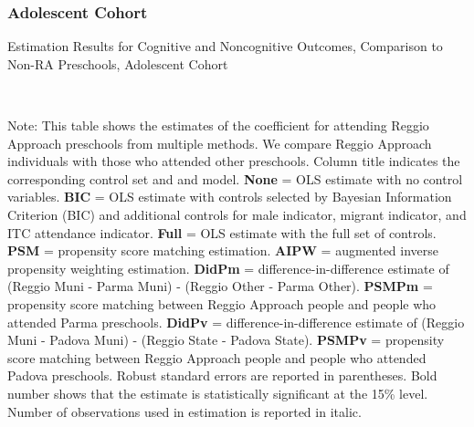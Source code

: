 \subsubsection{Adolescent Cohort}
\begin{table}[H] \caption{Estimation Results for Cognitive and Noncognitive Outcomes, Comparison to Non-RA Preschools, Adolescent Cohort} \label{ols-CN-adol-reg-reli}
\scalebox{0.8}{}
\vspace{1ex} \\
\footnotesize\raggedright{Note: This table shows the estimates of the coefficient for attending Reggio Approach preschools from multiple methods. We compare Reggio Approach individuals with those who attended other preschools. Column title indicates the corresponding control set and and model. \textbf{None} = OLS estimate with no control variables. \textbf{BIC} = OLS estimate with controls selected by Bayesian Information Criterion (BIC) and additional controls for male indicator, migrant indicator, and ITC attendance indicator. \textbf{Full} = OLS estimate with the full set of controls. \textbf{PSM} =  propensity score matching estimation. \textbf{AIPW} = augmented inverse propensity weighting estimation. \textbf{DidPm} = difference-in-difference estimate of (Reggio Muni - Parma Muni) - (Reggio Other - Parma Other). \textbf{PSMPm} = propensity score matching between Reggio Approach people and people who attended Parma preschools. \textbf{DidPv} = difference-in-difference estimate of (Reggio Muni - Padova Muni) - (Reggio State - Padova State). \textbf{PSMPv} = propensity score matching between Reggio Approach people and people who attended Padova preschools. Robust standard errors are reported in parentheses. Bold number shows that the estimate is statistically significant at the 15\% level. Number of observations used in estimation is reported in italic.}
\end{table}


